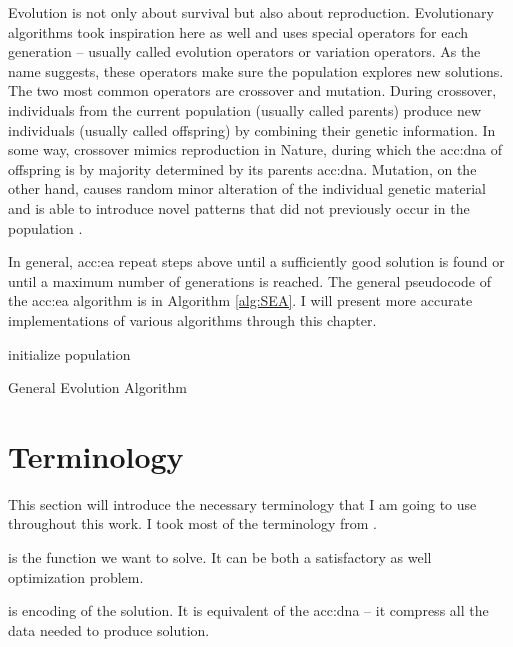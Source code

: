 Evolution is not only about survival but also about reproduction. Evolutionary algorithms took inspiration here as well and uses special operators for each generation -- usually called evolution operators or variation operators. As the name suggests, these operators make sure the population explores new solutions. The two most common operators are crossover and mutation. During crossover, individuals from the current population (usually called parents) produce new individuals (usually called offspring) by combining their genetic information. In some way, crossover mimics reproduction in Nature, during which the \acrshort{acc:dna} of offspring is by majority determined by its parents \acrshort{acc:dna}. Mutation, on the other hand, causes random minor alteration of the individual genetic material and is able to introduce novel patterns that did not previously occur in the population \citep{HowToSolveItModernHeuristics}.

In general, \acrshort{acc:ea} repeat steps above until a sufficiently good solution is found or until a maximum number of generations is reached. The general pseudocode of the \acrshort{acc:ea} algorithm is in Algorithm \ref{alg:SEA}. I will present more accurate implementations of various algorithms through this chapter.

\begin{algorithm}
    \SetAlgoLined
    initialize population\;
    \caption{General Evolution Algorithm}
    \label{alg:SEA}
\end{algorithm}




\section{Terminology}

This section will introduce the necessary terminology that I am going to use throughout this work. I took most of the terminology from \citet{IntroductionToEA}.

 is the function we want to solve. It can be both a satisfactory as well optimization problem.

 is encoding of the solution. It is equivalent of the \acrshort{acc:dna} -- it compress all the data needed to produce solution.

